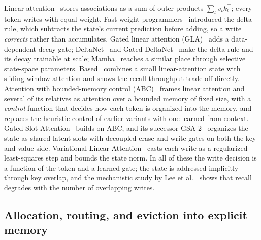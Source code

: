 \documentclass[conference]{IEEEtran}
\begin{document}
Linear attention~\cite{katharopoulos2020linear} stores associations as a sum of
outer products $\sum_t v_t k_t^\top$; every token writes with equal weight.
Fast-weight programmers~\cite{schlag2021fastweight} introduced the delta rule,
which subtracts the state's current prediction before adding, so a write
\emph{corrects} rather than accumulates. Gated linear attention
(GLA)~\cite{yang2023gla} adds a data-dependent decay gate; DeltaNet~\cite{yang2024deltanet} and Gated
DeltaNet~\cite{yang2024gateddeltanet} make the delta rule and its decay trainable
at scale; Mamba~\cite{gu2023mamba} reaches a similar place through selective
state-space parameters. Based~\cite{arora2024based} combines a small
linear-attention state with sliding-window attention and shows the
recall-throughput trade-off directly. Attention with bounded-memory control
(ABC)~\cite{peng2021abc} frames linear
attention and several of its relatives as attention over a bounded memory of
fixed size, with a \emph{control} function that decides how each token is
organized into the memory, and replaces the heuristic control of earlier
variants with one learned from context. Gated Slot Attention~\cite{zhang2024gsa}
builds on ABC, and its successor GSA-2~\cite{li2026gsa2} organizes the state as
shared latent slots with decoupled erase and write gates on both the key and
value side.
Variational Linear Attention~\cite{pandey2026vla} casts each write as a
regularized least-squares step and bounds the state norm. In all of these the
write decision is a function of the token and a learned gate; the state is
addressed implicitly through key overlap, and the mechanistic study by Lee et
al.~\cite{lee2026howlinear} shows that recall degrades with the number of
overlapping writes.

\subsection{Allocation, routing, and eviction into explicit memory}
\end{document}
